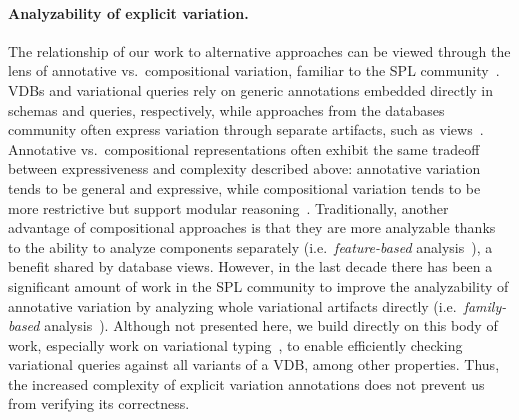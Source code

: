 \paragraph{Analyzability of explicit variation.}
%
The relationship of our work to alternative approaches can be viewed through
the lens of annotative vs.\ compositional variation, familiar to the SPL
community~\cite{KAK08}.
%
VDBs and variational queries rely on generic annotations embedded directly in schemas and
queries, respectively, while approaches from the databases community often
express variation through separate artifacts, such as views~\cite{bancilhon81}.
%
Annotative vs.\ compositional representations often exhibit the same tradeoff
between expressiveness and complexity described above: annotative variation
tends to be general and expressive, while compositional variation tends to be
more restrictive but support modular reasoning~\cite{KAK08}.
%
Traditionally, another advantage of compositional approaches is that they are
more analyzable thanks to the ability to analyze components separately (i.e.\
\emph{feature-based} analysis~\citep{Thuem14}), a benefit shared by database
views.
%
However, in the last decade there has been a significant amount of work in the
SPL community to improve the analyzability of annotative variation by analyzing
whole variational artifacts directly (i.e.\ \emph{family-based}
analysis~\cite{Thuem14}). 
%
Although not presented here, we build directly on this body of work, especially
work on variational typing~\cite{CEW12icfp,CEW14toplas}, to enable efficiently
checking variational queries against all variants of a VDB, among other properties.
%
Thus, the increased complexity of explicit variation annotations does not
prevent us from verifying its correctness.

%


%
%

